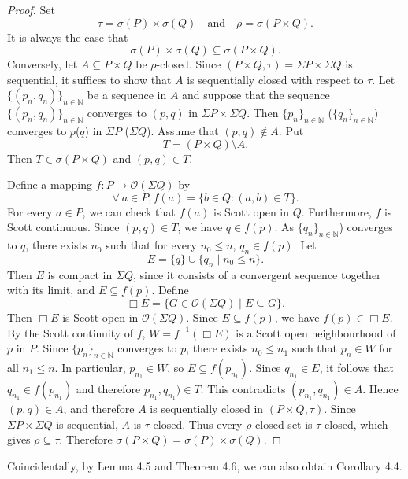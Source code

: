 \documentclass[preprint,12pt]{elsarticle}
\numberwithin{equation}{section}
\newtheorem{example}[theorem]{Example}
\begin{document}
\begin{proof}
Set $$\tau=\sigma(P)\times\sigma(Q)
    \quad\text{and}\quad
    \rho=\sigma(P\times Q).$$
It is always the case that $$\sigma(P)\times\sigma(Q)\subseteq\sigma(P\times Q).$$
Conversely, let $A\subseteq P\times Q$ be
$\rho$-closed. Since $(P\times Q,\tau)=\Sigma P\times\Sigma Q$
is sequential, it suffices to show that $A$ is sequentially closed
with respect to $\tau$. Let $\{(p_n,q_n)\}_{n\in\mathbb{N}}$ be a sequence in $A$ and suppose that
the sequence $\{(p_n,q_n)\}_{n\in\mathbb{N}}$ converges to $(p,q)$ in $\Sigma P\times\Sigma Q$. Then $\{p_n\}_{n\in\mathbb{N}}$ ($\{q_{n}\}_{n\in\mathbb{N}}$) converges to $p$($q$) in $\Sigma P$ ($\Sigma Q$). Assume that $(p,q)\notin A$. Put $$T=(P\times Q)\setminus A.$$ Then $T\in\sigma(P\times Q)$ and $(p,q)\in T$.

Define a mapping $f:P\longrightarrow\mathcal O(\Sigma Q)$ by
 $$ \forall\ a\in P, f(a)=\{b\in Q:(a,b)\in T\}.$$
For every $a\in P$, we can check that $f(a)$ is Scott open in $Q$. Furthermore,
$f$ is Scott continuous. Since $(p,q)\in T$, we have $q\in f(p)$. As
$\{q_{n}\}_{n\in\mathbb{N}}$) converges to $q$, there exists $n_{0}$ such
that for every $n_0\leq n$, $q_n\in f(p)$. Let
$$E=\{q\}\cup\{q_n\mid n_0\leq n\}.$$
Then $E$ is compact in $\Sigma Q$, since it consists of a
convergent sequence together with its limit, and $E\subseteq f(p)$. Define
$$\Box E=\{G\in\mathcal O(\Sigma Q)\mid E\subseteq G\}.$$
Then $\Box E$ is Scott open in $\mathcal O(\Sigma Q)$. Since $E\subseteq f(p)$, we have $f(p)\in\Box E$. By the Scott
continuity of $f$, $W=f^{-1}(\Box E)$
is a Scott open neighbourhood of $p$ in $P$. Since $\{p_n\}_{n\in\mathbb{N}}$ converges to $p$,
there exists $n_0\leq n_1$ such that $p_{n}\in W$ for all $n_1\leq n$. In particular, $p_{n_1}\in W$, so $E\subseteq f(p_{n_1})$. Since $q_{n_1}\in E$, it follows that $q_{n_1}\in f(p_{n_1})$ and therefore $p_{n_1},q_{n_1})\in T$. This contradicts $(p_{n_1},q_{n_1})\in A$. Hence $(p,q)\in A$, and therefore $A$ is sequentially closed in
$(P\times Q,\tau)$. Since $\Sigma P\times \Sigma Q$  is sequential, $A$ is
$\tau$-closed. Thus every $\rho$-closed set is $\tau$-closed,
which gives $\rho\subseteq\tau$. Therefore
$\sigma(P\times Q)=\sigma(P)\times\sigma(Q)$. \end{proof}

Coincidentally, by Lemma 4.5 and Theorem 4.6, we can also obtain Corollary 4.4.





\end{document}
